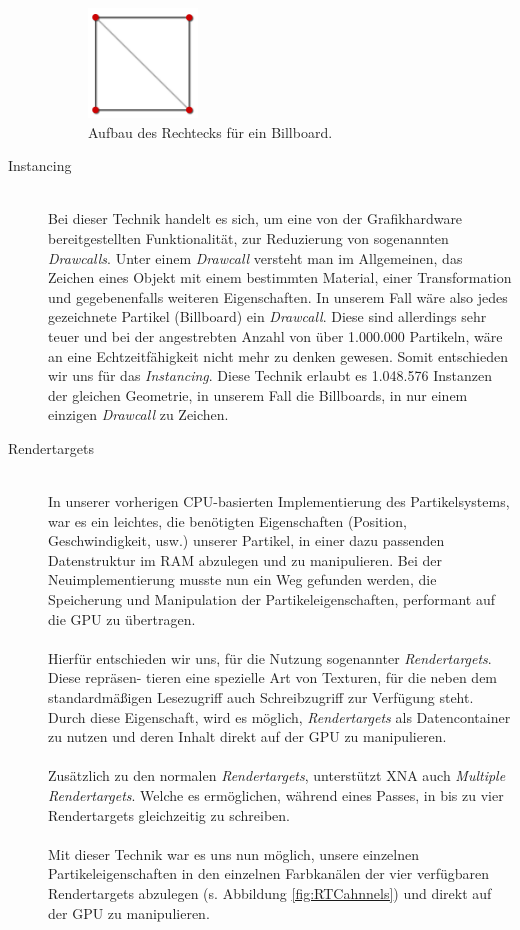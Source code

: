 \begin{Spacing}{\mylinespace}
\begin{description}
\begin{figure}[h!]
	\centering
	\vspace*{30px}
	\includegraphics[width=110px]{graphics/billboardQuad.png}
	\caption{Aufbau des Rechtecks für ein Billboard.}
	\label{fig:BBQuad}
\end{figure}
\newpage
	\item[Instancing] \hfill \\
	Bei dieser Technik handelt es sich, um eine von der Grafikhardware bereitgestellten Funktionalität, zur Reduzierung von sogenannten \textit{Drawcalls}. Unter einem \textit{Drawcall} versteht man im Allgemeinen, das Zeichen eines Objekt mit einem bestimmten Material, einer Transformation und gegebenenfalls weiteren Eigenschaften. In unserem Fall wäre also jedes gezeichnete Partikel (Billboard) ein \textit{Drawcall}. Diese sind allerdings sehr teuer und bei der angestrebten Anzahl von über 1.000.000 Partikeln, wäre an eine Echtzeitfähigkeit nicht mehr zu denken gewesen. Somit entschieden wir uns für das \textit{Instancing}. Diese Technik erlaubt es 1.048.576 Instanzen der gleichen Geometrie, in unserem Fall die Billboards, in nur einem einzigen \textit{Drawcall} zu Zeichen. 
	
	\item[Rendertargets] \hfill \\
	In unserer vorherigen CPU-basierten Implementierung des Partikelsystems, war es ein leichtes, die benötigten Eigenschaften (Position, Geschwindigkeit, usw.) unserer Partikel, in einer dazu passenden Datenstruktur im RAM abzulegen und zu manipulieren. Bei der Neuimplementierung musste nun ein Weg gefunden werden, die Speicherung und Manipulation der Partikeleigenschaften, performant auf die GPU zu übertragen.
\\\\
Hierfür entschieden wir uns, für die Nutzung sogenannter \textit{Rendertargets}.   Diese repräsen- tieren eine spezielle Art von Texturen, für die neben dem standardmäßigen Lesezugriff auch Schreibzugriff zur Verfügung steht. Durch diese Eigenschaft, wird es möglich, \textit{Rendertargets} als Datencontainer zu nutzen und deren Inhalt direkt auf der GPU zu manipulieren.
\\\\
Zusätzlich zu den normalen \textit{Rendertargets}, unterstützt XNA auch \textit{Multiple Rendertargets}. Welche es ermöglichen, während eines Passes, in bis zu vier Rendertargets gleichzeitig zu schreiben.
\\\\
Mit dieser Technik war es uns nun möglich, unsere einzelnen Partikeleigenschaften in den einzelnen Farbkanälen der vier verfügbaren Rendertargets abzulegen (s. Abbildung \ref{fig:RTCahnnels}) und direkt auf der GPU zu manipulieren. 
	

\end{description}
\end{Spacing}
